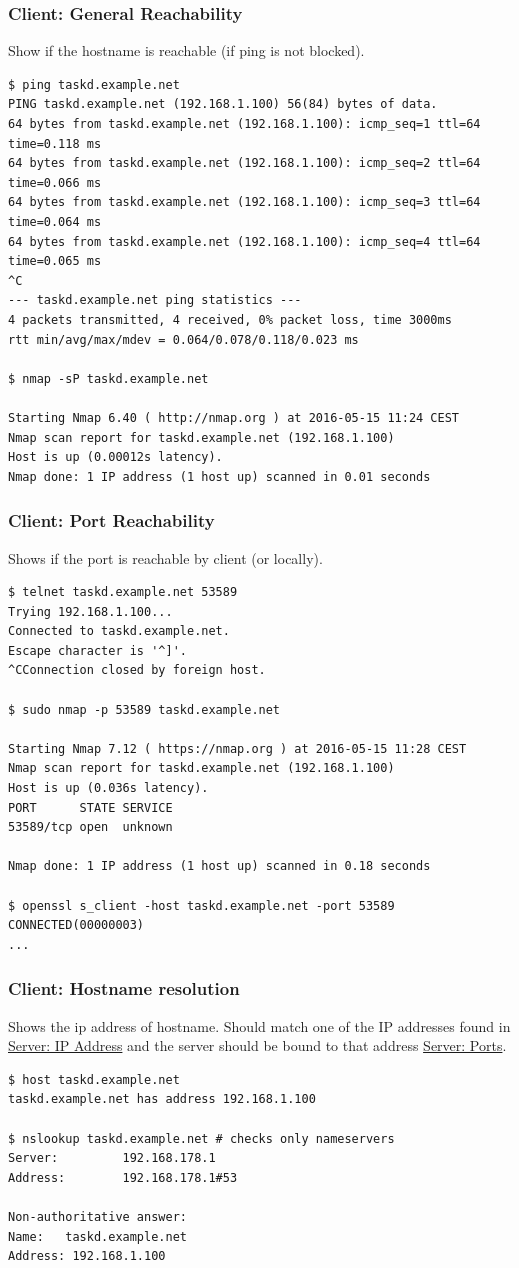 \documentclass[t,handout]{beamer}
\begin{document}
\begin{frame}[fragile]\frametitle{Client: General Reachability}\label{C1}
    \vfill
    Show if the hostname is reachable (if ping is not blocked).

    \begin{lstlisting}
$ ping taskd.example.net
PING taskd.example.net (192.168.1.100) 56(84) bytes of data.
64 bytes from taskd.example.net (192.168.1.100): icmp_seq=1 ttl=64 time=0.118 ms
64 bytes from taskd.example.net (192.168.1.100): icmp_seq=2 ttl=64 time=0.066 ms
64 bytes from taskd.example.net (192.168.1.100): icmp_seq=3 ttl=64 time=0.064 ms
64 bytes from taskd.example.net (192.168.1.100): icmp_seq=4 ttl=64 time=0.065 ms
^C
--- taskd.example.net ping statistics ---
4 packets transmitted, 4 received, 0% packet loss, time 3000ms
rtt min/avg/max/mdev = 0.064/0.078/0.118/0.023 ms

$ nmap -sP taskd.example.net

Starting Nmap 6.40 ( http://nmap.org ) at 2016-05-15 11:24 CEST
Nmap scan report for taskd.example.net (192.168.1.100)
Host is up (0.00012s latency).
Nmap done: 1 IP address (1 host up) scanned in 0.01 seconds\end{lstlisting}
\end{frame}

\begin{frame}[fragile]\frametitle{Client: Port Reachability}\label{C2}
    \vfill
    Shows if the port is reachable by client (or locally).

    \begin{lstlisting}
$ telnet taskd.example.net 53589
Trying 192.168.1.100...
Connected to taskd.example.net.
Escape character is '^]'.
^CConnection closed by foreign host.

$ sudo nmap -p 53589 taskd.example.net

Starting Nmap 7.12 ( https://nmap.org ) at 2016-05-15 11:28 CEST
Nmap scan report for taskd.example.net (192.168.1.100)
Host is up (0.036s latency).
PORT      STATE SERVICE
53589/tcp open  unknown

Nmap done: 1 IP address (1 host up) scanned in 0.18 seconds

$ openssl s_client -host taskd.example.net -port 53589
CONNECTED(00000003)
...\end{lstlisting}
\end{frame}

\begin{frame}[fragile]\frametitle{Client: Hostname resolution}\label{C3}
    \vfill
    Shows the ip address of hostname. Should match one of the IP addresses found in \hyperlink{C1}{Server: IP Address} and the server should be bound to that address \hyperlink{S2}{Server: Ports}.
    \begin{lstlisting}
$ host taskd.example.net
taskd.example.net has address 192.168.1.100

$ nslookup taskd.example.net # checks only nameservers
Server:         192.168.178.1
Address:        192.168.178.1#53

Non-authoritative answer:
Name:   taskd.example.net
Address: 192.168.1.100\end{lstlisting}
\end{frame}
\end{document}
